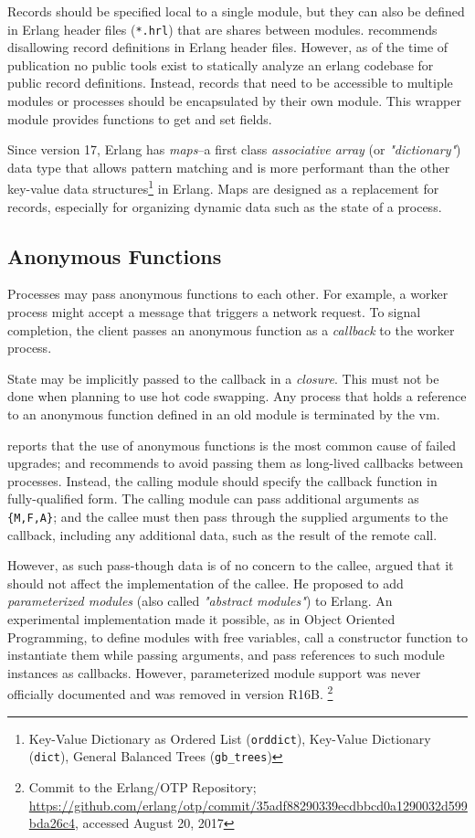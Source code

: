 Records should be specified local to a single module, but they can also be defined in Erlang header files (\lstinline|*.hrl|) that are shares between modules. \cite{davis:talk} recommends disallowing record definitions in Erlang header files. However, as of the time of publication no public tools exist to statically analyze an erlang codebase for public record definitions. Instead, records that need to be accessible to multiple modules or processes should be encapsulated by their own module. This wrapper module provides functions to get and set fields.

Since version 17, Erlang has \emph{maps}--a first class \emph{associative array} (or \emph{"dictionary"}) data type that allows pattern matching and is more performant than the other key-value data structures\footnote{Key-Value Dictionary as Ordered List (\lstinline|orddict|), Key-Value Dictionary (\lstinline|dict|), General Balanced Trees (\lstinline|gb_trees|)} in Erlang. Maps are designed as a replacement for records, especially for organizing dynamic data such as the state of a process.


\subsection{Anonymous Functions}

Processes may pass anonymous functions to each other. For example, a worker process might accept a message that triggers a network request. To signal completion, the client passes an anonymous function as a \emph{callback} to the worker process.

State may be implicitly passed to the callback in a \emph{closure}. This must not be done when planning to use hot code swapping. Any process that holds a reference to an anonymous function defined in an old module is terminated by the \acrshort{vm}.

\cite{davis:talk} reports that the use of anonymous functions is the most common cause of failed upgrades; and recommends to avoid passing them as long-lived callbacks between processes. Instead, the calling module should specify the callback function in fully-qualified form. The calling module can pass additional arguments as \lstinline|{M,F,A}|; and the callee must then pass through the supplied arguments to the callback, including any additional data, such as the result of the remote call.

However, as such pass-though data is of no concern to the callee, \cite{carlsson:parameterized} argued that it should not affect the implementation of the callee. He proposed to add \emph{parameterized modules} (also called \emph{"abstract modules"}) to Erlang. An experimental implementation made it possible, as in Object Oriented Programming, to define modules with free variables, call a constructor function to instantiate them while passing arguments, and pass references to such module instances as callbacks.
However, parameterized module support was never officially documented and was removed in version R16B.
\footnote{Commit to the Erlang/OTP Repository; \url{https://github.com/erlang/otp/commit/35adf88290339ecdbbcd0a1290032d599bda26c4}, accessed August 20, 2017}
